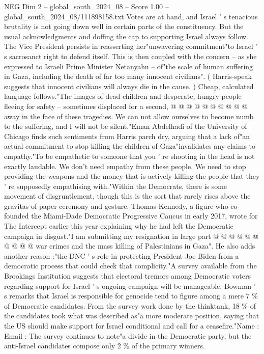 \begin{textsample}{NEG Dim 2 – global\_south\_2024\_08 – Score 1.00 – global\_south\_2024\_08/111898158.txt}
Votes are at hand, and Israel ' s tenacious brutality is not going down well in certain parts of the constituency.
But the usual acknowledgments and doffing the cap to supporting Israel always follow.
The Vice President persists in reasserting her"unwavering commitment"to Israel ' s sacrosanct right to defend itself.
This is then coupled with the concern -- as she expressed to Israeli Prime Minister Netanyahu -- of"the scale of human suffering in Gaza, including the death of far too many innocent civilians". ( Harris-speak suggests that innocent civilians will always die in the cause. ) Cheap, calculated language follows."The images of dead children and desperate, hungry people fleeing for safety -- sometimes displaced for a second, @ @ @ @ @ @ @ @ @ @ away in the face of these tragedies.
We can not allow ourselves to become numb to the suffering, and I will not be silent."Eman Abdelhadi of the University of Chicago finds such sentiments from Harris parch dry, arguing that a lack of"an actual commitment to stop killing the children of Gaza"invalidates any claims to empathy."To be empathetic to someone that you ' re shooting in the head is not exactly laudable.
We don't need empathy from these people.
We need to stop providing the weapons and the money that is actively killing the people that they ' re supposedly empathising with."Within the Democrats, there is some movement of disgruntlement, though this is the sort that rarely rises above the gravitas of paper ceremony and gesture.
Thomas Kennedy, a figure who co-founded the Miami-Dade Democratic Progressive Caucus in early 2017, wrote for The Intercept earlier this year explaining why he had left the Democratic campaign in disgust."I am submitting my resignation in large part @ @ @ @ @ @ @ @ @ @ war crimes and the mass killing of Palestinians in Gaza".
He also adds another reason :"the DNC ' s role in protecting President Joe Biden from a democratic process that could check that complicity."A survey available from the Brookings Institution suggests that electoral tremors among Democratic voters regarding support for Israel ' s ongoing campaign will be manageable.
Bowman ' s remarks that Israel is responsible for genocide tend to figure among a mere 7 \% of Democratic candidates.
From the survey work done by the thinktank, 18 \% of the candidates took what was described as"a more moderate position, saying that the US should make support for Israel conditional and call for a ceasefire."Name : Email : The survey continues to note"a divide in the Democratic party, but the anti-Israel candidates compose only 2 \% of the primary winners.

\end{textsample}
